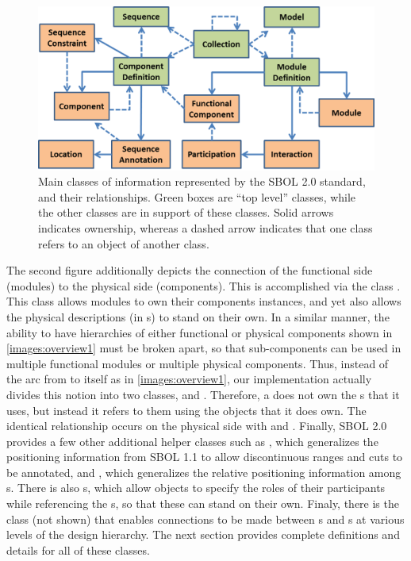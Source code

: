 \begin{figure}[ht]
\begin{center}
\includegraphics[scale=0.85]{images/OverviewFig2-v4.png}
\caption{Main classes of information represented by the SBOL 2.0 standard, and their relationships.  Green boxes are ``top level'' classes, while the other classes are in support of these classes. Solid arrows indicates ownership, whereas a dashed arrow indicates that one class refers to an object of another class.}
\label{images:overview2}
\end{center}
\end{figure}

The second figure additionally depicts the connection of the functional side (modules) to the physical side (components). 
This is accomplished via the class . This class allows modules to own their components instances, and yet also allows the physical descriptions (in s) to stand on their own. 
In a similar manner, the ability to have hierarchies of either functional or physical components shown in \ref{images:overview1} must be broken apart, so that sub-components can be used in multiple functional modules or multiple physical components. 
Thus, instead of the arc from  to itself as in \ref{images:overview1}, our implementation actually divides this notion into two classes,  and . 
Therefore, a  does not own the s that it uses, but instead it refers to them using the  objects that it does own.  The identical relationship occurs on the physical side with  and . Finally, SBOL 2.0 provides a few other additional helper classes such as , which generalizes the positioning information from SBOL 1.1 to allow discontinuous ranges and cuts to be annotated, and , which generalizes the relative positioning information among s.  There is also 
s, which allow  objects to specify the roles of their participants while referencing the s, so that these can stand on their own. Finaly, there is the  class (not shown) that enables connections to be made between s and s at various levels of the design hierarchy.  The next section provides complete definitions and details for all of these classes.

